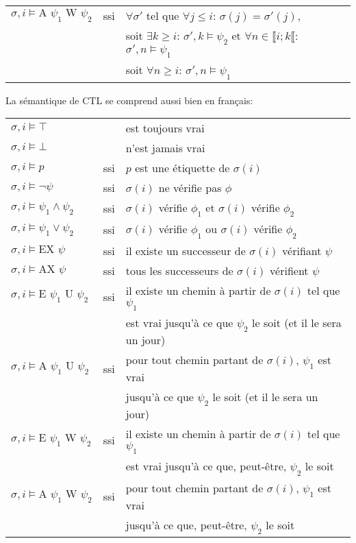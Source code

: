\documentclass[10pt,a4paper]{article}
\begin{document}
\begin{tabular}{lcl}
$\sigma,i \vDash \mbox{A } \psi_1 \mbox{ W } \psi_2$ &ssi& $\forall \sigma'$ tel que $\forall j \leq i$: $\sigma(j) = \sigma'(j)$, \\
& & soit $\exists k \geq i$: $\sigma',k\vDash \psi_2$ et $\forall n \in \llbracket i; k \llbracket$: $\sigma',n \vDash \psi_1$\\
& & soit $\forall n \geq i$: $\sigma',n \vDash \psi_1$\\
\end{tabular}

La sémantique de CTL se comprend aussi bien en français:\\

\begin{tabular}{lcl}
$\sigma,i \vDash \top$ && est toujours vrai\\
$\sigma,i \vDash \bot$ && n'est jamais vrai\\
$\sigma,i \vDash p$ &ssi& $p$ est une étiquette de $\sigma(i)$\\
$\sigma,i \vDash \neg \psi$ &ssi& $\sigma(i)$ ne vérifie pas $\phi$\\
$\sigma,i \vDash \psi_1 \land \psi_2$ &ssi& $\sigma(i)$ vérifie $\phi_1$ et $\sigma(i)$ vérifie $\phi_2$\\
$\sigma,i \vDash \psi_1 \lor \psi_2$ &ssi& $\sigma(i)$ vérifie $\phi_1$ ou $\sigma(i)$ vérifie $\phi_2$\\
$\sigma,i \vDash \mbox{EX } \psi$ &ssi& il existe un successeur de $\sigma(i)$ vérifiant $\psi$\\
$\sigma,i \vDash \mbox{AX } \psi$ &ssi& tous les successeurs de $\sigma(i)$ vérifient $\psi$\\
$\sigma,i \vDash \mbox{E } \psi_1 \mbox{ U } \psi_2$ &ssi& il existe un chemin à partir de $\sigma(i)$ tel que $\psi_1$\\&& est vrai jusqu'à ce que $\psi_2$ le soit (et il le sera un jour)\\

$\sigma,i \vDash \mbox{A } \psi_1 \mbox{ U } \psi_2$ &ssi& pour tout chemin partant de $\sigma(i)$, $\psi_1$ est vrai \\&& jusqu'à ce que $\psi_2$ le soit (et il le sera un jour)\\

$\sigma,i \vDash \mbox{E } \psi_1 \mbox{ W } \psi_2$ &ssi& il existe un chemin à partir de $\sigma(i)$ tel que $\psi_1$\\&& est vrai jusqu'à ce que, peut-être, $\psi_2$ le soit\\

$\sigma,i \vDash \mbox{A } \psi_1 \mbox{ W } \psi_2$ &ssi& pour tout chemin partant de $\sigma(i)$, $\psi_1$ est vrai \\&& jusqu'à ce que, peut-être, $\psi_2$ le soit\\
\end{tabular}
\end{document}
